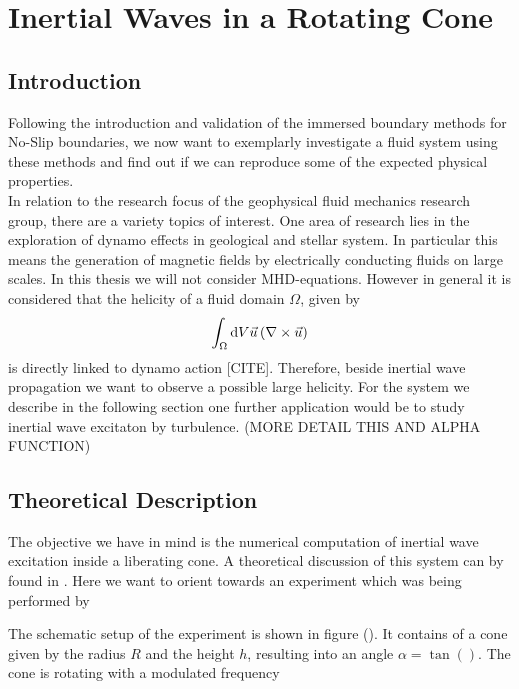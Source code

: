\chapter{Inertial Waves in a Rotating Cone}

\section{Introduction}

Following the introduction and validation of the immersed boundary methods for No-Slip boundaries,
we now want to exemplarly investigate a fluid system using these methods
and find out if we can reproduce some of the expected physical properties.\\
In relation to the research focus of the geophysical fluid mechanics research group, there are a variety
topics of interest.
One area of research lies in the exploration of dynamo effects in geological and stellar system.
In particular this means the generation of magnetic fields by electrically conducting fluids on large scales.
In this thesis we will not consider MHD-equations.
However in general it is considered that the helicity of a fluid domain $\Omega$, given by
\begin{align}
    \int_{\Omega}\mathop{}\!\mathrm{d} V  \vec{u} \left( \nabla \times \vec{u} \right)
\end{align}
is directly linked to dynamo action [CITE].
Therefore, beside inertial wave propagation we want to observe a possible large helicity.
For the system we describe in the following section one further application
would be to study inertial wave excitaton by turbulence. (MORE DETAIL THIS AND ALPHA FUNCTION)

\section{Theoretical Description}

The objective we have in mind is the numerical computation of inertial wave excitation inside a liberating cone.
A theoretical discussion of this system  can by found in \citep{GREENSPAN}.
Here we want to orient towards an experiment which was being performed by \citep{Beardsley1970}

The schematic setup of the experiment is shown in figure ().
It contains of a cone given by the radius $R$ and the height $h$, resulting into an angle $\alpha = \tan()$.
The cone is rotating with a modulated frequency

